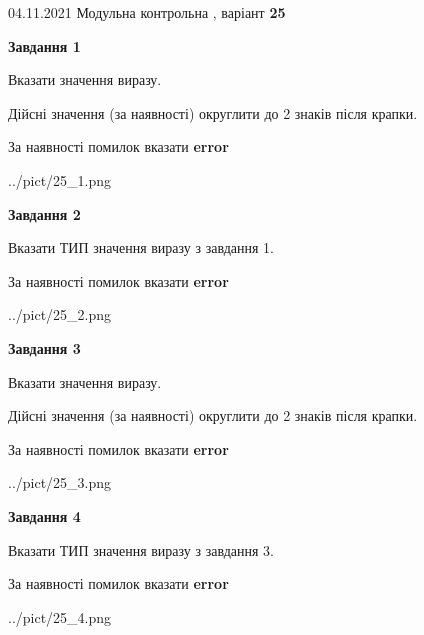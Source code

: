\documentclass[11pt, ukrainian]{article}
\begin{document}
{04.11.2021 Модульна контрольна , варіант  \No \textbf { 25 }\par}
{
\begin {large}
{\begin {center}\textbf{Завдання 1}\end {center}}\par
Вказати значення виразу. \par
Дійсні значення (за наявності) округлити до 2 знаків після крапки. \par
За наявності помилок вказати \textbf{error}

\begin{center}
	{../pict/25_1.png}
\end{center}
\newpage

{\begin {center}\textbf{Завдання 2}\end {center}}\par
Вказати ТИП значення виразу з завдання 1. \par
За наявності помилок вказати \textbf{error}

\begin{center}
	{../pict/25_2.png}
\end{center}
\newpage

{\begin {center}\textbf{Завдання 3}\end {center}}\par
Вказати значення виразу. \par
Дійсні значення (за наявності) округлити до 2 знаків після крапки. \par
За наявності помилок вказати \textbf{error}

\begin{center}
	{../pict/25_3.png}
\end{center}
\newpage

{\begin {center}\textbf{Завдання 4}\end {center}}\par
Вказати ТИП значення виразу з завдання 3. \par
За наявності помилок вказати \textbf{error}

\begin{center}
	{../pict/25_4.png}
\end{center}
\newpage


\end{large}}
\end{document}
